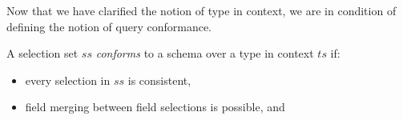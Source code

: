 
Now that we have clarified the notion of type in context, we are in condition of defining the notion of query conformance. 

\begin{definition}
A \gql selection set $ss$ \textit{conforms} to a schema \schema over a type in context $ts$ if:
\begin{itemize}
    \item every selection in $ss$ is consistent, 

    \item field merging between field selections is possible, and


\end{itemize}
\end{definition}
